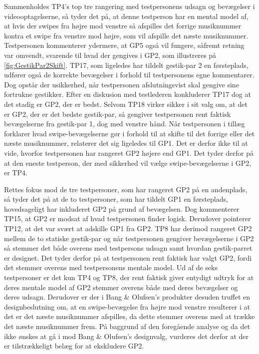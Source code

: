 \noindent
%
Sammenholdes TP4's top tre rangering med testpersonens udsagn og bevægelser i videooptagelserne, så tyder det på, at denne testperson har en mental model af, at hvis der swipes fra højre mod venstre så afspilles det forrige musiknummer kontra et swipe fra venstre mod højre, som vil afspille det næste musiknummer. Testpersonen kommenterer ydermere, at GP5 også vil fungere, såfremt retning var omvendt, svarende til hvad der gengives i GP2, som illustreres på \autoref{fig:GestikPar2Skift}. TP17, som ligeledes har tildelt gestik-par 2 en førsteplads, udfører også de korrekte bevægelser i forhold til testpersonens egne kommentarer. Dog opstår der usikkerhed, når testpersonen afslutningsvist skal gengive sine fortrukne gestikker. Efter en diskusion med testlederen konkluderer TP17 dog at det stadig er GP2, der er bedst. Selvom TP18 virker sikker i sit valg om, at det er GP2, der er det bedste gestik-par, så gengiver testpersonen rent faktisk bevægelserne fra gestik-par 1, dog med venstre hånd. Når testpersonen i tillæg forklarer hvad swipe-bevægelserne gør i forhold til at skifte til det forrige eller det næste musiknummer, relaterer det sig ligeledes til GP1. Det er derfor ikke til at vide, hvorfor testpersonen har rangeret GP2 højere end GP1. Det tyder derfor på at den eneste testperson, der med sikkerhed vil vælge swipe-bevægelserne i GP2, er TP4. 

Rettes fokus mod de tre testpersoner, som har rangeret GP2 på en andenplads, så tyder det på at de to testpersoner, som har tildelt GP1 en førsteplads, hovedsageligt har inkluderet GP2 på grund af bevægelsen. Dog kommenterer TP15, at GP2 er modsat af hvad testpersonen finder logisk. Derudover pointerer TP12, at det var svært at adskille GP1 fra GP2. TP8 har derimod rangeret GP2 mellem de to statiske gestik-par og når testpersonen gengiver bevægelserne i GP2 så stemmer det både overens med testpersons udsagn samt hvordan gestik-parret er designet. Det tyder derfor på at testpersonen rent faktisk har valgt GP2, fordi det stemmer overens med testpersonens mentale model.\blankline 
%
Ud af de seks testpersoner er det kun TP4 og TP8, der rent faktisk giver entydigt udtryk for at deres mentale model af GP2 stemmer overens både med deres bevægelser og deres udsagn. Derudover er der i Bang $\&$ Olufsen's produkter desuden truffet en designbeslutning om, at en swipe-bevægelse fra højre mod venstre resulterer i at det er det næste musiknummer afspilles, da dette stemmer overens med at trække det næste musiknummer frem. På baggrund af den foregående analyse og da det ikke ønskes at gå i mod Bang $\&$ Olufsen's designvalg, vurderes det derfor at der er tilstrækkeligt belæg for at ekskludere GP2. 


